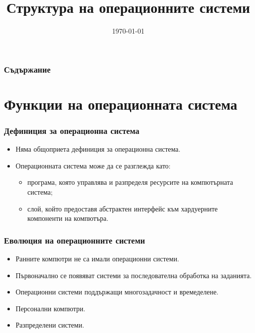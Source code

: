 \documentclass[ignorenonframetext, hyperref=unicode]{beamer}
\title[Структура на ОС]{Структура на операционните системи} \lubo
\date{\today}
\begin{document}
\frame{\maketitle}

\begin{frame}
\frametitle{Съдържание}
\tableofcontents %
\end{frame}


\section{Функции на операционната система}

\begin{frame}
\frametitle{Дефиниция за операционна система}
\begin{itemize}
\item Няма общоприета дефиниция за операционна система.
\item Операционната система може да се разглежда като:
\begin{itemize}
\item програма, която управлява и разпределя ресурсите на компютърната
система;
\item слой, който предоставя абстрактен интерфейс към хардуерните компоненти на
компютъра.
\end{itemize}
\end{itemize}
\end{frame}


\begin{frame}
\frametitle{Еволюция на операционните системи}
\begin{itemize}
\item Ранните компютри не са имали операционни системи.
\item Първоначално се появяват системи за последователна обработка на заданията.
\item Операционни системи поддържащи многозадачност и времеделене.
\item Персонални компютри.
\item Разпределени системи.
\end{itemize}
\end{frame}
\end{document}
